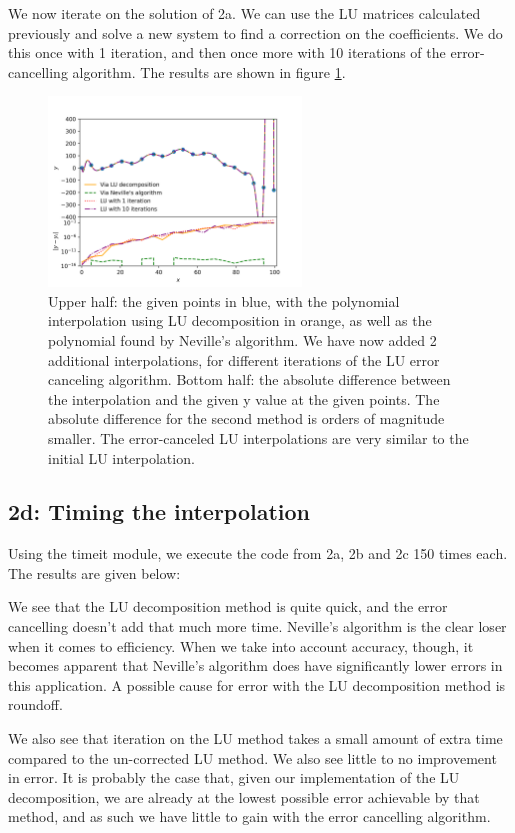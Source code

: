 We now iterate on the solution of 2a. We can use the LU matrices calculated previously and solve a new system to find a correction on the coefficients. We do this once with 1 iteration, and then once more with 10 iterations of the error-cancelling algorithm. The results are shown in figure \ref{fig:2c}.

\begin{figure}[h!]
\label{fig:2c}
\caption{Upper half: the given points in blue, with the polynomial interpolation using LU decomposition in orange, as well as the polynomial found by Neville's algorithm. We have now added 2 additional interpolations, for different iterations of the LU error canceling algorithm. Bottom half: the absolute difference between the interpolation and the given y value at the given points. The absolute difference for the second method is orders of magnitude smaller. The error-canceled LU interpolations are very similar to the initial LU interpolation.}
\centering
\includegraphics[width=0.6\textwidth]{my_vandermonde_sol_2c.png}
\end{figure}



\subsection{2d: Timing the interpolation}

Using the timeit module, we execute the code from 2a, 2b and 2c 150 times each. The results are given below:



We see that the LU decomposition method is quite quick, and the error cancelling doesn't add that much more time. Neville's algorithm is the clear loser when it comes to efficiency. When we take into account accuracy, though, it becomes apparent that Neville's algorithm does have significantly lower errors in this application. A possible cause for error with the LU decomposition method is roundoff. 

We also see that iteration on the LU method takes a small amount of extra time compared to the un-corrected LU method. We also see little to no improvement in error. It is probably the case that, given our implementation of the LU decomposition, we are already at the lowest possible error achievable by that method, and as such we have little to gain with the error cancelling algorithm. 



